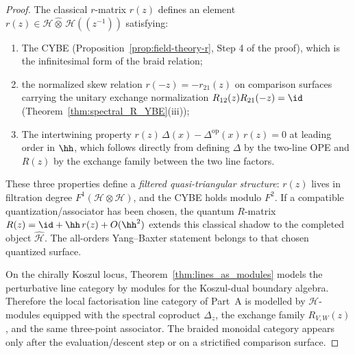 \begin{proof}
The classical $r$-matrix $r(z)$ defines an element $r(z) \in \mathcal{H} \widehat{\otimes}\, \mathcal{H}((z^{-1}))$ satisfying:
\begin{enumerate}[label=(\alph*)]
\item The CYBE (Proposition~\ref{prop:field-theory-r}, Step 4 of the proof), which is the infinitesimal form of the braid relation;
\item the normalized skew relation \(r(-z)=-r_{21}(z)\) on comparison
surfaces carrying the unitary exchange normalization
\(R_{12}(z)R_{21}(-z)=\id\)
\textup{(}Theorem~\ref{thm:spectral_R_YBE}\textup{(}iii\textup{)}\textup{)};
\item The intertwining property $r(z)\,\Delta(x) - \Delta^{\mathrm{op}}(x)\,r(z) = 0$ at leading order in $\hh$, which follows directly from defining $\Delta$ by the two-line OPE and $R(z)$ by the exchange family between the two line factors.
\end{enumerate}
These three properties define a \emph{filtered quasi-triangular
structure}: $r(z)$ lives in filtration degree
$F^1(\mathcal{H} \otimes \mathcal{H})$, and the CYBE holds modulo
$F^2$. If a compatible quantization/associator has been chosen, the
quantum $R$-matrix $R(z)=\id+\hh\,r(z)+O(\hh^2)$ extends this
classical shadow to the completed object $\widehat{\mathcal H}$. The
all-orders Yang--Baxter statement belongs to that chosen quantized
surface.

On the chirally Koszul locus,
Theorem~\ref{thm:lines_as_modules} models the perturbative line
category by modules for the Koszul-dual boundary algebra.  Therefore
the local factorisation line category of Part~A is modelled by
$\mathcal H$-modules equipped with the spectral coproduct
$\Delta_z$, the exchange family $R_{V,W}(z)$, and the same
three-point associator.  The braided monoidal category appears only
after the evaluation/descent step or on a strictified comparison
surface.
\end{proof}


